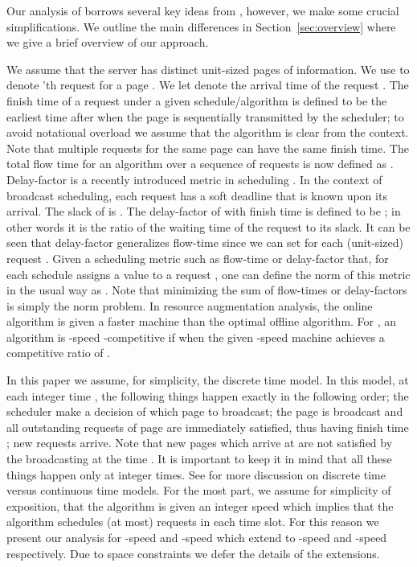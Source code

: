 \documentclass[11pt]{article}
\begin{document}
\begin{titlepage}
Our analysis of  borrows several key ideas from
\cite{EdmondsP04}, however, we make some crucial simplifications. We
outline the main differences in Section~\ref{sec:overview} where we
give a brief overview of our approach.

\medskip
{} We assume that
the server has  distinct unit-sized pages of
information.  We use  to denote 'th request for a page
.  We let  denote the arrival
time of the request . The finish time  of a
request  under a given schedule/algorithm is defined to
be the earliest time after  when the page  is
sequentially transmitted by the scheduler; to avoid notational
overload we assume that the algorithm is clear from the context.
Note that multiple requests for the same page can have the same
finish time. The total flow time for an algorithm over a sequence
of requests is now defined as .
Delay-factor is a recently introduced metric in scheduling
\cite{ChangEGK08,BenderCT08,ChekuriM09}.  In the context of
broadcast scheduling, each request  has a soft deadline
 that is known upon its arrival. The slack of 
is . The delay-factor of  with finish
time  is defined to be ; in other words it is the ratio of
the waiting time of the request to its slack. It can be seen that
delay-factor generalizes flow-time since we can set  for each (unit-sized) request . Given a
scheduling metric such as flow-time or delay-factor that, for each
schedule assigns a value  to a request , one can
define the  norm of this metric in the usual way as
. Note that minimizing the sum
of flow-times or delay-factors is simply the  norm problem.
In resource augmentation analysis, the online algorithm is given a
faster machine than the optimal offline algorithm. For ,
an algorithm  is -speed -competitive if  when the
given -speed machine achieves a competitive ratio of .

In this paper we assume, for simplicity, the discrete time model. In
this model, at each integer time , the following things happen
exactly in the following order; the scheduler make a decision of which
page  to broadcast; the page  is broadcast and all outstanding
requests of page  are immediately satisfied, thus having finish
time ; new requests arrive. Note that new pages which arrive at 
are not satisfied by the broadcasting at the time . It is important
to keep it in mind that all these things happen only at integer times.
See \cite{EdmondsP04} for more discussion on discrete time versus
continuous time models. For the most part, we assume for simplicity
of exposition, that the algorithm is given an integer speed  which
implies that the algorithm schedules (at most)  requests in each
time slot.  For this reason we present our analysis for -speed and
-speed which extend to -speed and -speed
respectively.  Due to space constraints we defer the details of the
extensions.


\end{titlepage}
\end{document}
